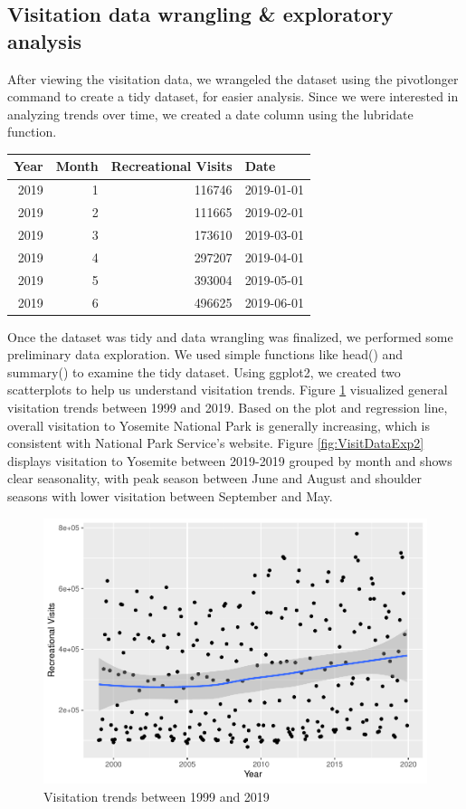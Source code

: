 \documentclass[
  12pt,
]{article}
\begin{document}
\hypertarget{visitation-data-wrangling-exploratory-analysis}{%
\subsection{Visitation data wrangling \& exploratory analysis}\label{visitation-data-wrangling-exploratory-analysis}}

After viewing the visitation data, we wrangeled the dataset using the pivotlonger command to create a tidy dataset, for easier analysis. Since we were interested in analyzing trends over time, we created a date column using the lubridate function.

\begin{tabular}{r|r|r|l}
\hline
Year & Month & Recreational Visits & Date\\
\hline
2019 & 1 & 116746 & 2019-01-01\\
\hline
2019 & 2 & 111665 & 2019-02-01\\
\hline
2019 & 3 & 173610 & 2019-03-01\\
\hline
2019 & 4 & 297207 & 2019-04-01\\
\hline
2019 & 5 & 393004 & 2019-05-01\\
\hline
2019 & 6 & 496625 & 2019-06-01\\
\hline
\end{tabular}

Once the dataset was tidy and data wrangling was finalized, we performed some preliminary data exploration. We used simple functions like head() and summary() to examine the tidy dataset. Using ggplot2, we created two scatterplots to help us understand visitation trends. Figure \ref{fig:VisitDataExp1} visualized general visitation trends between 1999 and 2019. Based on the plot and regression line, overall visitation to Yosemite National Park is generally increasing, which is consistent with National Park Service's website. Figure \ref{fig:VisitDataExp2} displays visitation to Yosemite between 2019-2019 grouped by month and shows clear seasonality, with peak season between June and August and shoulder seasons with lower visitation between September and May.

\begin{figure}
\centering
\includegraphics{CodeFinal_files/figure-latex/VisitDataExp1-1.pdf}
\caption{\label{fig:VisitDataExp1}Visitation trends between 1999 and 2019}
\end{figure}
\end{document}
